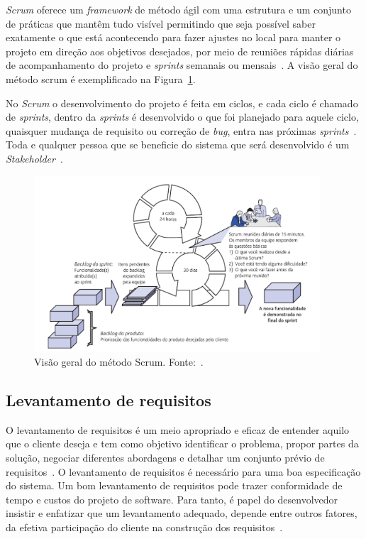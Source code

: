 \textit{Scrum} oferece um \textit{framework} de método ágil com uma estrutura e um conjunto de práticas que mantêm tudo visível permitindo que seja possível saber exatamente o que está acontecendo para fazer ajustes no local para manter o projeto em direção aos objetivos desejados, por meio de reuniões rápidas diárias de acompanhamento do projeto e \textit{sprints} semanais ou mensais~\citep{schwaber2004agile}. 
A visão geral do método scrum é exemplificado na Figura~\ref{fig:scrum}.

No \textit{Scrum} o desenvolvimento do projeto é feita em ciclos, e cada ciclo é chamado de \textit{sprints}, dentro da \textit{sprints} é desenvolvido o que foi planejado para aquele ciclo, quaisquer mudança de requisito ou correção de \textit{bug}, entra nas próximas \textit{sprints}~\citep{pressman2016engenharia}.
Toda e qualquer pessoa que se beneficie do sistema que será desenvolvido é um \textit{Stakeholder}~\citep{pressman2016engenharia}.

\begin{figure}[H]
    \centering
    \includegraphics[width=0.95\textwidth]{img/scrum.PNG}
    \caption[Visão geral do método Scrum]{Visão geral do método Scrum. Fonte:~\cite{pressman2016engenharia}.}
    \label{fig:scrum}
\end{figure}

\subsection{Levantamento de requisitos}
\indent

O levantamento de requisitos é um meio apropriado e eficaz de entender aquilo que o cliente deseja e tem como objetivo identificar o problema, propor partes da solução, negociar diferentes abordagens e detalhar um conjunto prévio de requisitos~\citep{pressmanengenharia}. 
O levantamento de requisitos é necessário para uma boa especificação do sistema.
Um bom levantamento de requisitos pode trazer conformidade de tempo e custos do projeto de software. Para tanto, é papel do desenvolvedor insistir e enfatizar que um levantamento adequado, depende entre outros fatores, da efetiva participação do cliente na construção dos requisitos~\citep{de2003engenharia}.

